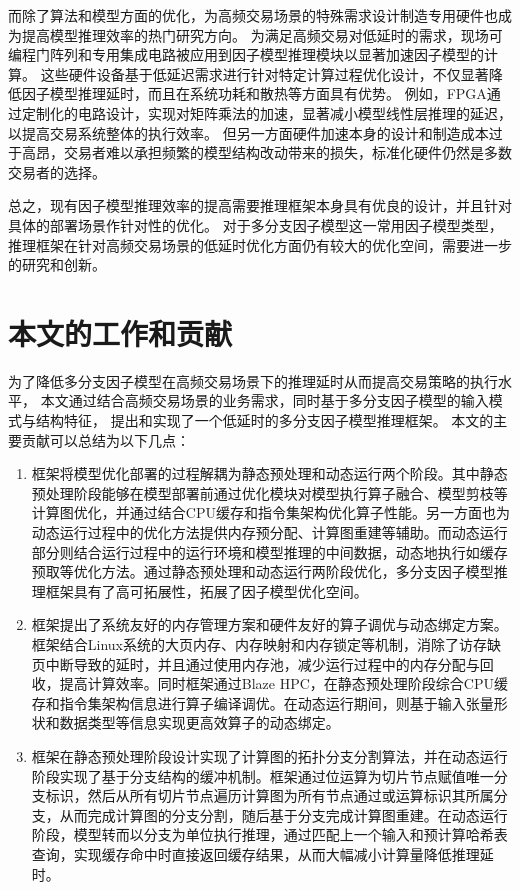 而除了算法和模型方面的优化，为高频交易场景的特殊需求设计制造专用硬件也成为提高模型推理效率的热门研究方向。
为满足高频交易对低延时的需求，现场可编程门阵列和专用集成电路被应用到因子模型推理模块以显著加速因子模型的计算。
这些硬件设备基于低延迟需求进行针对特定计算过程优化设计，不仅显著降低因子模型推理延时，而且在系统功耗和散热等方面具有优势。
例如，FPGA通过定制化的电路设计，实现对矩阵乘法的加速，显著减小模型线性层推理的延迟，以提高交易系统整体的执行效率\cite{ALI20241}。
但另一方面硬件加速本身的设计和制造成本过于高昂，交易者难以承担频繁的模型结构改动带来的损失，标准化硬件仍然是多数交易者的选择。

总之，现有因子模型推理效率的提高需要推理框架本身具有优良的设计，并且针对具体的部署场景作针对性的优化。
对于多分支因子模型这一常用因子模型类型，推理框架在针对高频交易场景的低延时优化方面仍有较大的优化空间，需要进一步的研究和创新。

\section{本文的工作和贡献}

为了降低多分支因子模型在高频交易场景下的推理延时从而提高交易策略的执行水平，
本文通过结合高频交易场景的业务需求，同时基于多分支因子模型的输入模式与结构特征，
提出和实现了一个低延时的多分支因子模型推理框架。
本文的主要贡献可以总结为以下几点：
\begin{enumerate}
\item 框架将模型优化部署的过程解耦为静态预处理和动态运行两个阶段。其中静态预处理阶段能够在模型部署前通过优化模块对模型执行算子融合、模型剪枝等计算图优化，并通过结合CPU缓存和指令集架构优化算子性能。另一方面也为动态运行过程中的优化方法提供内存预分配、计算图重建等辅助。而动态运行部分则结合运行过程中的运行环境和模型推理的中间数据，动态地执行如缓存预取等优化方法。通过静态预处理和动态运行两阶段优化，多分支因子模型推理框架具有了高可拓展性，拓展了因子模型优化空间。
\item 框架提出了系统友好的内存管理方案和硬件友好的算子调优与动态绑定方案。框架结合Linux系统的大页内存、内存映射和内存锁定等机制，消除了访存缺页中断导致的延时，并且通过使用内存池，减少运行过程中的内存分配与回收，提高计算效率。同时框架通过Blaze HPC，在静态预处理阶段综合CPU缓存和指令集架构信息进行算子编译调优。在动态运行期间，则基于输入张量形状和数据类型等信息实现更高效算子的动态绑定。
\item 框架在静态预处理阶段设计实现了计算图的拓扑分支分割算法，并在动态运行阶段实现了基于分支结构的缓冲机制。框架通过位运算为切片节点赋值唯一分支标识，然后从所有切片节点遍历计算图为所有节点通过或运算标识其所属分支，从而完成计算图的分支分割，随后基于分支完成计算图重建。在动态运行阶段，模型转而以分支为单位执行推理，通过匹配上一个输入和预计算哈希表查询，实现缓存命中时直接返回缓存结果，从而大幅减小计算量降低推理延时。
\end{enumerate}

